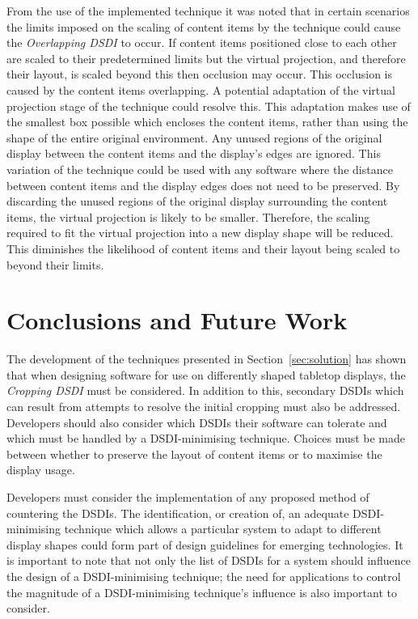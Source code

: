 \documentclass[twocolumn,compsoc]{cvm}
\begin{document}
{From the use of the implemented technique it was noted that in certain scenarios the limits imposed on the scaling of content items by the technique could cause the {\emph{Overlapping \ac{DSDI}}} to occur.
If content items positioned close to each other are scaled to their predetermined limits but the virtual projection, and therefore their layout, is scaled beyond this then occlusion may occur.
This occlusion is caused by the content items overlapping.
A potential adaptation of the virtual projection stage of the technique could resolve this.  
This adaptation makes use of the smallest box possible which encloses the content items, rather than using the shape of the entire original environment.
Any unused regions of the original display between the content items and the display's edges are ignored.
This variation of the technique could be used with any software where the distance between content items and the display edges does not need to be preserved.
By discarding the unused regions of the original display surrounding the content items, the virtual projection is likely to be smaller.
Therefore, the scaling required to fit the virtual projection into a new display shape will be reduced.
This diminishes the likelihood of content items and their layout being scaled to beyond their limits. 


\section{Conclusions and Future Work}
\label{sec:conclusion}

The development of the techniques presented in Section~\ref{sec:solution} has shown that when designing software for use on differently shaped tabletop displays, the {\emph{Cropping \ac{DSDI}}} must be considered.
In addition to this, secondary \acp{DSDI} which can result from attempts to resolve the initial cropping must also be addressed.
Developers should also consider which \acp{DSDI} their software can tolerate and which must be handled by a \ac{DSDI}-minimising technique.
Choices must be made between whether to preserve the layout of content items or to maximise the display usage.

Developers must consider the implementation of any proposed method of countering the \acp{DSDI}.
The identification, or creation of, an adequate \ac{DSDI}-minimising technique which allows a particular system to adapt to different display shapes could form part of design guidelines for emerging technologies.
It is important to note that not only the list of \acp{DSDI} for a system should influence the design of a \ac{DSDI}-minimising technique; the need for applications to control the magnitude of a \ac{DSDI}-minimising technique's influence is also important to consider.

}
\end{document}
